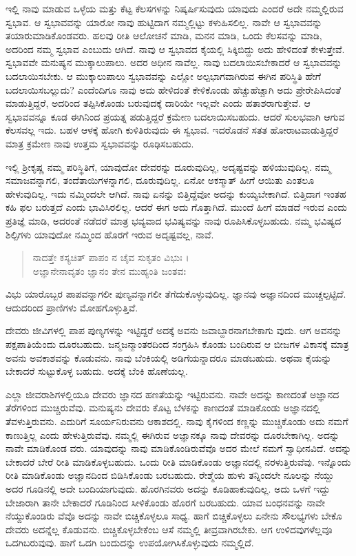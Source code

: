 ಇಲ್ಲಿ ನಾವು ಮಾಡುವ ಒಳ್ಳೆಯ ಮತ್ತು ಕೆಟ್ಟ ಕೆಲಸಗಳನ್ನು ನಿಷ್ಕರ್ಷಿಸುವುದು ಯಾವುದು ಎಂದರೆ ಅದೇ ನಮ್ಮಲ್ಲಿರುವ ಸ್ವಭಾವ. ಆ ಸ್ವಭಾವವನ್ನು ಯಾರೋ ನಾವು ಹುಟ್ಟಿದಾಗ ನಮ್ಮಲ್ಲಿಟ್ಟು ಕಳುಹಿಸಲಿಲ್ಲ. ನಾವೇ ಆ ಸ್ವಭಾವವನ್ನು ತಯಾರುಮಾಡಿಕೊಂಡವರು. ಹಲವು ರೀತಿ ಆಲೋಚನೆ ಮಾಡಿ, ಮನನ ಮಾಡಿ, ಒಂದು ಕೆಲಸವನ್ನು ಮಾಡಿ, ಅದರಿಂದ ನಮ್ಮ ಸ್ವಭಾವ ಎಂಬುದು ಆಗಿದೆ. ನಾವು ಆ ಸ್ವಭಾವದ ಕೈಯಲ್ಲಿ ಸಿಕ್ಕಿಬಿದ್ದು ಅದು ಹೇಳಿದಂತೆ ಕೇಳುತ್ತೇವೆ. ಸ್ವಭಾವವೇ ಮನುಷ್ಯನ ಮುಕ್ಕಾಲುಪಾಲು. ಅದರ ಅಧೀನ ನಾವೆಲ್ಲ. ನಾವು ಬದಲಾಯಿಸಬೇಕಾದರೆ ಆ ಸ್ವಭಾವವನ್ನು ಬದಲಾಯಿಸಬೇಕು. ಆ ಮುಕ್ಕಾಲುಪಾಲು ಸ್ವಭಾವವನ್ನು ಎಲ್ಲೋ ಅಲ್ಪಭಾಗವಾಗಿರುವ ಈಗಿನ ಪರಿಸ್ಥಿತಿ ಹೇಗೆ ಬದಲಾಯಿಸಬಲ್ಲುದು? ಎಂದೆಂದಿಗೂ ನಾವು ಅದು ಹೇಳಿದಂತೆ ಕೇಳಿಕೊಂಡು ಹೆಚ್ಚುಹೆಚ್ಚಾಗಿ ಅದು ಪ್ರೇರೇಪಿಸಿದಂತೆ ಮಾಡುತ್ತಿದ್ದರೆ, ಅದರಿಂದ ತಪ್ಪಿಸಿಕೊಂಡು ಬರುವುದಕ್ಕೆ ದಾರಿಯೇ ಇಲ್ಲವೇ ಎಂದು ಹತಾಶರಾಗುತ್ತೇವೆ. ಆ ಸ್ವಭಾವವನ್ನೂ ಕೂಡ ಈಗಿನಿಂದ ಪ್ರಯತ್ನ ಪಡುತ್ತಿದ್ದರೆ ಕ್ರಮೇಣ ಬದಲಾಯಿಸಬಹುದು. ಆದರೆ ಸುಲಭವಾಗಿ ಆಗುವ ಕೆಲಸವಲ್ಲ ಇದು. ಬಹಳ ಆಳಕ್ಕೆ ಹೋಗಿ ಕುಳಿತಿರುವುದು ಈ ಸ್ವಭಾವ. ಇದರೊಡನೆ ಸತತ ಹೋರಾಟವಾಡುತ್ತಿದ್ದರೆ ಮಾತ್ರ ಕ್ರಮೇಣ ನಾವು ಉತ್ತಮ ಸ್ವಭಾವವನ್ನು ರೂಢಿಸಬಹುದು.

ಇಲ್ಲಿ ಶ್ರೀಕೃಷ್ಣ ನಮ್ಮ ಪರಿಸ್ಥಿತಿಗೆ, ಯಾವುದೋ ದೇವರನ್ನು ದೂರುವುದಿಲ್ಲ, ಅದೃಷ್ಟವನ್ನು ಹಳಿಯುವುದಿಲ್ಲ. ನಮ್ಮ ಸಮಾಜವನ್ನಾಗಲಿ, ತಂದೆತಾಯಿಗಳನ್ನಾಗಲಿ, ದೂರುವುದಿಲ್ಲ. ಏನೋ ಅಕಸ್ಮಾತ್ ಹೀಗೆ ಆಯಿತು ಎಂತಲೂ ಹೇಳುವುದಿಲ್ಲ. ಇದು ನಮ್ಮಿಂದಲೇ ಆಗಿದೆ. ನಾವು ಏನನ್ನು ಬಿತ್ತಿದ್ದೆವೋ ಅದನ್ನು ಕುಯ್ಯಬೇಕಾಗಿದೆ. ಬಿತ್ತಿದಾಗ ಇಂತಹ ಕಹಿ ಫಲ ಬರುತ್ತದೆ ಎಂದು ಭಾವಿಸಿರಲಿಲ್ಲ. ಆದರೆ ಈಗ ಅದು ಗೊತ್ತಾಗಿದೆ. ಮುಂದೆ ಹೀಗೆ ಮಾಡದೆ ಇರುವ ಎಂದು ಪ್ರತಿಜ್ಞೆ ಮಾಡಿ, ಅದರಂತೆ ನಡೆದರೆ ಮಾತ್ರ ಭವ್ಯವಾದ ಭವಿಷ್ಯವನ್ನು ನಾವು ರೂಪಿಸಿಕೊಳ್ಳಬಹುದು. ನಮ್ಮ ಭವಿಷ್ಯದ ಶಿಲ್ಪಿಗಳು ಯಾವುದೋ ನಮ್ಮಿಂದ ಹೊರಗೆ ಇರುವ ಅದೃಷ್ಟವಲ್ಲ, ನಾವೆ.

\begin{verse}
ನಾದತ್ತೇ ಕಸ್ಯಚಿತ್ ಪಾಪಂ ನ ಚೈವ ಸುಕೃತಂ ವಿಭುಃ ।\\ಅಜ್ಞಾನೇನಾವೃತಂ ಜ್ಞಾನಂ ತೇನ ಮುಹ್ಯಂತಿ ಜಂತವಃ 
\end{verse}

{\small ವಿಭು ಯಾರೊಬ್ಬರ ಪಾಪವನ್ನಾಗಲೀ ಪುಣ್ಯವನ್ನಾಗಲೀ ತೆಗೆದುಕೊಳ್ಳುವುದಿಲ್ಲ. ಜ್ಞಾನವು ಅಜ್ಞಾನದಿಂದ ಮುಚ್ಚಲ್ಪಟ್ಟಿದೆ. ಆದುದರಿಂದ ಪ್ರಾಣಿಗಳು ಮೋಹಗೊಳ್ಳುತ್ತಿವೆ.}

ದೇವರು ಜೀವಿಗಳಲ್ಲಿ ಪಾಪ ಪುಣ್ಯಗಳನ್ನು ಇಟ್ಟಿದ್ದರೆ ಅದಕ್ಕೆ ಅವನು ಜವಾಬ್ದಾರನಾಗಬೇಕಾಗು ವುದು. ಆಗ ಅವನನ್ನು ಪಕ್ಷಪಾತಿಯೆಂದು ದೂರಬಹುದು. ಜನ್ಮಜನ್ಮಾಂತರದಿಂದ ಸಂಗ್ರಹಿಸಿ ಕೊಂಡು ಬಂದಿರುವ ಆ ಬೀಜಗಳ ವಿಕಾಸಕ್ಕೆ ಮಾತ್ರ ಅವನು ಅವಕಾಶವನ್ನು ಕೊಡುವನು. ನಾವು ಬೆಂಕಿಯಲ್ಲಿ ಅಡಿಗೆಯನ್ನಾದರೂ ಮಾಡಬಹುದು. ಅಥವಾ ಕೈಯನ್ನು ಬೇಕಾದರೆ ಸುಟ್ಟುಕೊಳ್ಳ ಬಹುದು. ಅದಕ್ಕೆ ಬೆಂಕಿ ಹೊಣೆಯಲ್ಲ.

ಎಲ್ಲಾ ಜೀವರಾಶಿಗಳಲ್ಲಿಯೂ ದೇವರು ಜ್ಞಾನದ ಹಣತೆಯನ್ನು ಇಟ್ಟಿರುವನು. ನಾವೇ ಅದನ್ನು ಕಾಣದಂತೆ ಅಜ್ಞಾನದ ತೆರೆಗಳಿಂದ ಮುಚ್ಚಿರುವೆವು. ಮನುಷ್ಯನು ದೇವರು ಕೊಟ್ಟ ಬೆಳಕನ್ನು ಕಾಣದಂತೆ ಮಾಡಿಕೊಂಡು ಅಜ್ಞಾನದಲ್ಲಿ ತೆವಳುತ್ತಿರುವನು. ಎದುರಿಗೆ ಸೂರ್ಯನಿರುವನು ಆಕಾಶದಲ್ಲಿ. ನಾವು ಕೈಗಳಿಂದ ಕಣ್ಣನ್ನು ಮುಚ್ಚಿಕೊಂಡು ಅದು ನಮಗೆ ಕಾಣುತ್ತಿಲ್ಲ ಎಂದು ಹೇಳುತ್ತಿರುವೆವು. ನಮ್ಮಲ್ಲಿ ಈಗಿರುವ ಅಜ್ಞಾನಕ್ಕೂ ನಾವು ದೇವರನ್ನು ದೂರಬೇಕಾಗಿಲ್ಲ. ಅದನ್ನು ನಾವೇ ಮಾಡಿಕೊಂಡ ವರು. ಯಾವುದನ್ನು ನಾವು ಮಾಡಿಕೊಂಡಿರುವೆವೊ ಅದರ ಮೇಲೆ ನಮಗೆ ಸ್ವಾಧೀನವಿದೆ. ಅದನ್ನು ಬೇಕಾದರೆ ಬೇರೆ ರೀತಿ ಮಾಡಿಕೊಳ್ಳಬಹುದು. ಒಂದು ರೀತಿ ಮಾಡಿಕೊಂಡು ಅಜ್ಞಾನದಲ್ಲಿ ನರಳುತ್ತಿರುವೆವು. ಇನ್ನೊಂದು ರೀತಿ ಮಾಡಿಕೊಂಡು ಅಜ್ಞಾನದಿಂದ ಬಿಡಿಸಿಕೊಂಡು ಬರಬಹುದು. ರೇಶ್ಮೆಯ ಹುಳು ತನ್ನಿಂದಲೇ ನೂಲನ್ನು ನೆಯ್ದು ಅದರ ಗೂಡಿನಲ್ಲಿ ಅದೇ ಬಂದಿಯಾಗುವುದು. ಹೊರಗಿನವರು ಅದನ್ನು ಕೂಡಿಹಾಕುವುದಿಲ್ಲ. ಅದು ಒಳಗೆ ಇದ್ದು ಬೇಜಾರಾಗಿ ತಾನೇ ಬೇಕಾದರೆ ಗೂಡಿನಿಂದ ಸೀಳಿಕೊಂಡು ಹೊರಗೆ ಬರಬಹುದು. ಯಾವ ಬಂಧನವನ್ನು ನಾವೇ ನೆಯ್ದುಕೊಂಡಿರು ವೆವೊ ಅದನ್ನು ನಾವೇ ಬಿಚ್ಚಿಕೊಳ್ಳಲೂ ಸಾಧ್ಯ. ಹಾಗೆ ಬಿಚ್ಚಿಕೊಳ್ಳಲು ಏನೇನು ಸೌಲಭ್ಯಗಳು ಬೇಕೊ ದೇವರು ಅದನ್ನೆಲ್ಲ ಕೊಡುವನು. ಬಿಚ್ಚಿಕೊಳ್ಳಬೇಕೆಂಬ ಆಸೆ ನಮ್ಮಲ್ಲಿ ತೀವ್ರವಾಗಿರಬೇಕು. ಆಗ ಉಳಿದವುಗಳೆಲ್ಲವೂ ಒದಗಿಬರುವುವು. ಹಾಗೆ ಒದಗಿ ಬಂದುದನ್ನು ಉಪಯೋಗಿಸಿಕೊಳ್ಳುವುದು ನಮ್ಮಲ್ಲಿದೆ.

